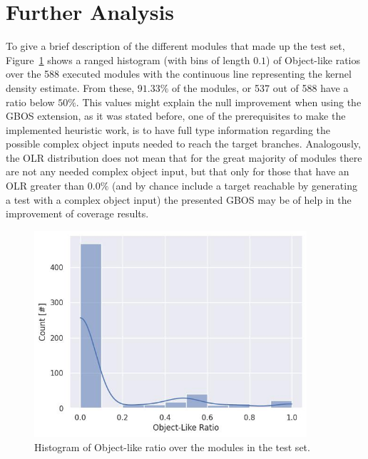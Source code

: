 \documentclass[%
  chapterprefix=false,%
  open=right,%
  twoside=true,%
  paper=a4,%
  logofile={Figures/logo.png},%
  thesistype=master,%
  UKenglish,%
]{se2thesis}
\begin{document}
\newpage

\section{Further Analysis}\label{sec:further}

To give a brief description of the different modules that made up the test set, Figure~\ref{fig:olr-hist} shows a ranged histogram (with bins of length \(0.1\)) of Object-like ratios over the 588 executed modules with the continuous line representing the kernel density estimate.
From these, \(91.33\%\) of the modules, or 537 out of 588 have a ratio below \(50\%\).
This values might explain the null improvement when using the GBOS extension, as it was stated before, one of the prerequisites to make the implemented heuristic work, is to have full type information regarding the possible complex object inputs needed to reach the target branches.
Analogously, the OLR distribution does not mean that for the great majority of modules there are not any needed complex object input, but that only for those that have an OLR greater than \(0.0\%\) (and by chance include a target reachable by generating a test with a complex object input) the presented GBOS may be of help in the improvement of coverage results.

\begin{figure}[bth]
  \centering
  \includegraphics[width=0.9\textwidth]{Figures/Results/olr-hist.jpg}
  \caption{Histogram of Object-like ratio over the modules in the test set.}\label{fig:olr-hist}
\end{figure}
\end{document}
